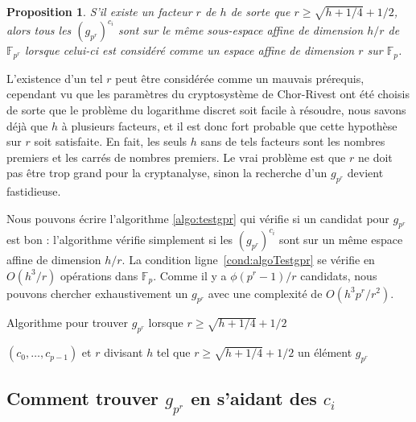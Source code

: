 \documentclass[a4paper, titlepage, 11pt]{article}
\newtheorem{prop}[theo]{Proposition}
\theoremstyle{definition}
\theoremstyle{remark}
\def\O{O}
\def\gf #1{\mathbb{F}_{#1}}
\begin{document}
\begin{prop}
S'il existe un facteur $r$ de $h$ de sorte que $r \geqslant \sqrt{h + 1/4} + 1/2$, alors tous les $(g_{p^r})^{c_i}$ sont sur le même sous-espace affine de dimension $h/r$ de $\gf{p^r}$ lorsque celui-ci est considéré comme un espace affine de dimension $r$ sur $\gf{p}$.
\end{prop}

L'existence d'un tel $r$ peut être considérée comme un mauvais prérequis, cependant vu que les paramètres du cryptosystème de Chor-Rivest ont été choisis de sorte que le problème du logarithme discret soit facile à résoudre, nous savons déjà que $h$ à plusieurs facteurs, et il est donc fort probable que cette hypothèse sur $r$ soit satisfaite. En fait, les seuls $h$ sans de tels facteurs sont les nombres premiers et les carrés de nombres premiers. Le vrai problème est que $r$ ne doit pas être trop grand pour la cryptanalyse, sinon la recherche d'un $g_{p^r}$ devient fastidieuse.

Nous pouvons écrire l'algorithme \ref{algo:testgpr} qui vérifie si un candidat pour $g_{p^r}$ est bon : l'algorithme vérifie simplement si les $(g_{p^r})^{c_i}$ sont sur un même espace affine de dimension $h/r$. La condition ligne~\ref{cond:algoTestgpr} se vérifie en $\O(h^3/r)$ opérations dans $\gf{p}$. Comme il y a $\phi(p^r-1)/r$ candidats, nous pouvons chercher exhaustivement un $g_{p^r}$ avec une complexité de $\O(h^3p^r/r^2)$.

\begin{algorithm}[h]
\caption{Algorithme pour trouver $g_{p^r}$ lorsque $r\geqslant \sqrt{h + 1/4} + 1/2$}
\label{algo:testgpr}
\begin{algorithmic}[1]
\REQUIRE $(c_0,\dots, c_{p-1})$ et $r$ divisant $h$ tel que $r\geqslant \sqrt{h + 1/4} + 1/2$
\ENSURE un élément $g_{p^r}$
\FORALL{$\zeta \in \gf{p^h}$ générateur de $\gf{p^r}^\times$} \label{boucle:algoTestgpr}
		\label{cond:algoTestgpr}
		\ENDIF
	\ENDFOR
	\RETURN{$\zeta$}
\ENDFOR
\end{algorithmic}
\end{algorithm}

\subsection{Comment trouver $g_{p^r}$ en s'aidant des $c_i$}
\end{document}
